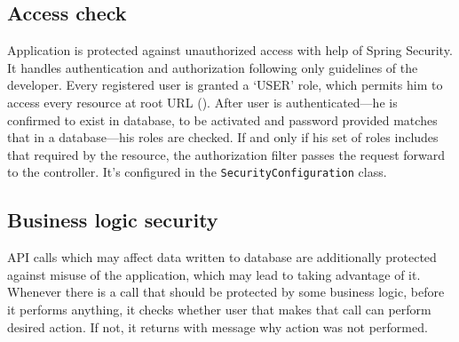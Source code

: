\documentclass[a4paper,twoside,12pt]{book}
\begin{document}
    \subsection{Access check}
      Application is protected against unauthorized access with help of Spring Security. It handles authentication and authorization following only guidelines of the developer.
      Every registered user is granted a `USER' role, which permits him to access every resource at root URL ().
      After user is authenticated---he is confirmed to exist in database, to be activated and password provided matches that in a database---his roles are checked.
      If and only if his set of roles includes that required by the resource, the authorization filter passes the request forward to the controller.
      It's configured in the \lstinline{SecurityConfiguration} class.

    \subsection{Business logic security}
      API calls which may affect data written to database are additionally protected against misuse of the application, which may lead to taking advantage of it.
      Whenever there is a call that should be protected by some business logic, before it performs anything, 
      it checks whether user that makes that call can perform desired action. If not, it returns with message why action was not performed. 
      
\end{document}
